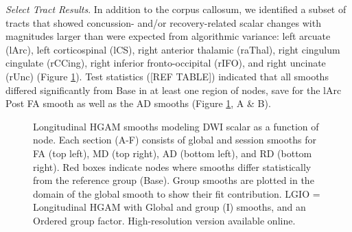 \documentclass[12pt]{article}
\begin{document}

\textit{Select Tract Results}. In addition to the corpus callosum, we identified a subset of tracts that showed concussion- and/or recovery-related scalar changes with magnitudes larger than were expected from algorithmic variance: left arcuate (lArc), left corticospinal (lCS), right anterior thalamic (raThal), right cingulum cingulate (rCCing), right inferior fronto-occipital (rIFO), and right uncinate (rUnc) (Figure \ref{fig:lgio-gam-sel}). Test statistics ([REF TABLE]) indicated that all smooths differed significantly from Base in at least one region of nodes, save for the lArc Post FA smooth as well as the AD smooths (Figure \ref{fig:lgio-gam-sel}, A \& B).

\begin{figure}[H]
	\centering
	\caption{Longitudinal HGAM smooths modeling DWI scalar as a function of node. Each section (A-F) consists of global and session smooths for FA (top left), MD (top right), AD (bottom left), and RD (bottom right). Red boxes indicate nodes where smooths differ statistically from the reference group (Base). Group smooths are plotted in the domain of the global smooth to show their fit contribution. LGIO = Longitudinal HGAM with Global and group (I) smooths, and an Ordered group factor. High-resolution version available online.}
	\label{fig:lgio-gam-sel}
\end{figure}
\end{document}
